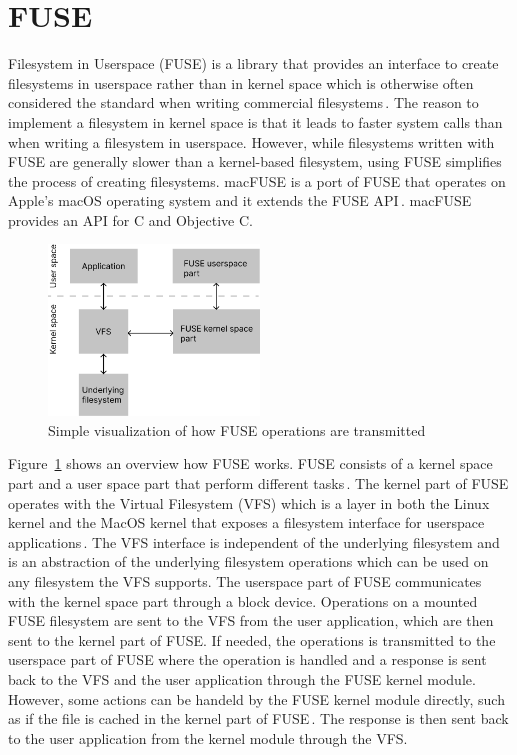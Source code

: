 \section{FUSE}
Filesystem in Userspace (FUSE) is a library that provides an interface to create filesystems in userspace rather than in kernel space which is otherwise often considered the standard when writing commercial filesystems\,\cite{Libfuse2021}. The reason to implement a filesystem in kernel space is that it leads to faster system calls than when writing a filesystem in userspace. However, while filesystems written with FUSE are generally slower than a kernel-based filesystem, using FUSE simplifies the process of creating filesystems. macFUSE is a port of FUSE that operates on Apple's macOS operating system and it extends the FUSE API\,\cite{HomeMacFUSE}. macFUSE provides an API for C and Objective C.

\begin{figure}[!ht]
	\begin{center}
	  \includegraphics[width=0.5\textwidth]{figures/fuse_description.png}
	\end{center}
	\caption{Simple visualization of how FUSE operations are transmitted}
	\label{fig:fuse_desc}
\end{figure}

Figure~\ref{fig:fuse_desc} shows an overview how FUSE works. FUSE consists of a kernel space part and a user space part that perform different tasks\,\cite{vangoorFUSENotFUSE2017}. The kernel part of FUSE operates with the Virtual Filesystem (VFS) which is a layer in both the Linux kernel and the MacOS kernel that exposes a filesystem interface for userspace applications\,\cite{goochOverviewLinuxVirtual, singhMacOSInternals2006}. The VFS interface is independent of the underlying filesystem and is an abstraction of the underlying filesystem operations which can be used on any filesystem the VFS supports. The userspace part of FUSE communicates with the kernel space part through a block device. Operations on a mounted FUSE filesystem are sent to the VFS from the user application, which are then sent to the kernel part of FUSE. If needed, the operations is transmitted to the userspace part of FUSE where the operation is handled and a response is sent back to the VFS and the user application through the FUSE kernel module. However, some actions can be handeld by the FUSE kernel module directly, such as if the file is cached in the kernel part of FUSE\,\cite{vangoorFUSENotFUSE2017}. The response is then sent back to the user application from the kernel module through the VFS.